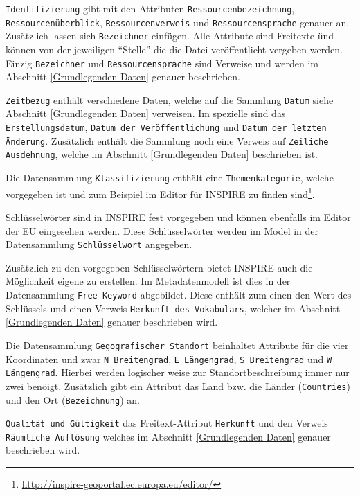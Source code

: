 \texttt{Identifizierung} gibt mit den Attributen \texttt{Ressourcenbezeichnung}, \texttt{Ressourcen\"uberblick}, \texttt{Ressourcenverweis} und \texttt{Ressourcensprache} genauer an. Zus\"atzlich lassen sich \texttt{Bezeichner} einf\"ugen. Alle Attribute sind Freitexte \"und k\"onnen von der jeweiligen "`Stelle"' die die Datei ver\"offentlicht vergeben werden. Einzig \texttt{Bezeichner} und \texttt{Ressourcensprache} sind Verweise und werden im Abschnitt \ref{Grundlegenden Daten} genauer beschrieben.

\texttt{Zeitbezug} enth\"alt verschiedene Daten, welche auf die Sammlung \texttt{Datum} siehe Abschnitt \ref{Grundlegenden Daten} verweisen. Im spezielle sind das \texttt{Erstellungsdatum}, \texttt{Datum der Ver\"offentlichung} und \texttt{Datum der letzten \"Anderung}. Zus\"atzlich enth\"alt die Sammlung noch eine Verweis auf \texttt{Zeiliche Ausdehnung}, welche im Abschnitt \ref{Grundlegenden Daten} beschrieben ist.

Die Datensammlung \texttt{Klassifizierung} enth\"alt eine \texttt{Themenkategorie}, welche vorgegeben ist und zum Beispiel im Editor f\"ur \ac{INSPIRE} zu finden sind\footnote{\url{http://inspire-geoportal.ec.europa.eu/editor/}}.

Schl\"usselw\"orter sind in \ac{INSPIRE} fest vorgegeben und k\"onnen ebenfalls im Editor der \ac{EU} eingesehen werden. Diese Schl\"usselw\"orter werden im Model in der Datensammlung \texttt{Schl\"usselwort} angegeben.

Zus\"atzlich zu den vorgegeben Schl\"usselw\"ortern bietet \ac{INSPIRE} auch die M\"oglichkeit eigene zu erstellen. Im Metadatenmodell ist dies in der Datensammlung \texttt{Free  Keyword} abgebildet. Diese enth\"alt zum einen den Wert des Schl\"ussels und einen Verweis \texttt{Herkunft des Vokabulars}, welcher im Abschnitt \ref{Grundlegenden Daten} genauer beschrieben wird.

Die Datensammlung \texttt{Gegografischer Standort} beinhaltet Attribute f\"ur die vier Koordinaten und zwar \texttt{N Breitengrad}, \texttt{E L\"angengrad}, \texttt{S Breitengrad} und \texttt{W L\"angengrad}. Hierbei werden logischer weise zur Standortbeschreibung immer nur zwei ben\"oigt. Zus\"atzlich gibt ein Attribut das Land bzw. die L\"ander (\texttt{Countries}) und den Ort (\texttt{Bezeichnung}) an.

\texttt{Qualit\"at und G\"ultigkeit} das Freitext-Attribut \texttt{Herkunft} und den Verweis \texttt{R\"aumliche Aufl\"osung} welches im Abschnitt \ref{Grundlegenden Daten} genauer beschrieben wird.

